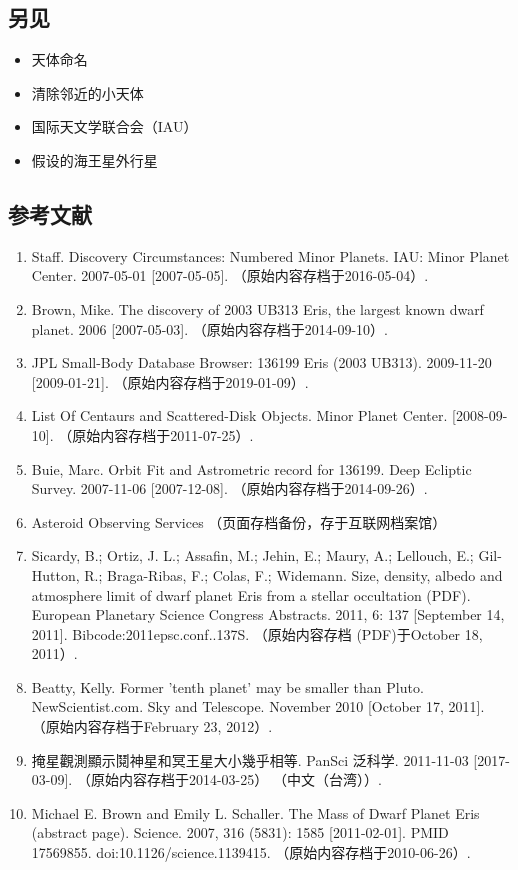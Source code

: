 \subsection{另见}
\begin{itemize}
\item 天体命名
\item 清除邻近的小天体
\item 国际天文学联合会（IAU）
\item 假设的海王星外行星
\end{itemize}
\subsection{参考文献}
\begin{enumerate}
\item Staff. Discovery Circumstances: Numbered Minor Planets. IAU: Minor Planet Center. 2007-05-01 [2007-05-05]. （原始内容存档于2016-05-04）.
\item Brown, Mike. The discovery of 2003 UB313 Eris, the largest known dwarf planet. 2006 [2007-05-03]. （原始内容存档于2014-09-10）.
\item JPL Small-Body Database Browser: 136199 Eris (2003 UB313). 2009-11-20 [2009-01-21]. （原始内容存档于2019-01-09）.
\item List Of Centaurs and Scattered-Disk Objects. Minor Planet Center. [2008-09-10]. （原始内容存档于2011-07-25）.
\item Buie, Marc. Orbit Fit and Astrometric record for 136199. Deep Ecliptic Survey. 2007-11-06 [2007-12-08]. （原始内容存档于2014-09-26）.
\item Asteroid Observing Services （页面存档备份，存于互联网档案馆）
\item Sicardy, B.; Ortiz, J. L.; Assafin, M.; Jehin, E.; Maury, A.; Lellouch, E.; Gil-Hutton, R.; Braga-Ribas, F.; Colas, F.; Widemann. Size, density, albedo and atmosphere limit of dwarf planet Eris from a stellar occultation (PDF). European Planetary Science Congress Abstracts. 2011, 6: 137 [September 14, 2011]. Bibcode:2011epsc.conf..137S. （原始内容存档 (PDF)于October 18, 2011）.
\item Beatty, Kelly. Former 'tenth planet' may be smaller than Pluto. NewScientist.com. Sky and Telescope. November 2010 [October 17, 2011]. （原始内容存档于February 23, 2012）.
\item 掩星觀測顯示鬩神星和冥王星大小幾乎相等. PanSci 泛科学. 2011-11-03 [2017-03-09]. （原始内容存档于2014-03-25） （中文（台湾））.
\item Michael E. Brown and Emily L. Schaller. The Mass of Dwarf Planet Eris (abstract page). Science. 2007, 316 (5831): 1585 [2011-02-01]. PMID 17569855. doi:10.1126/science.1139415. （原始内容存档于2010-06-26）.

\end{enumerate}
